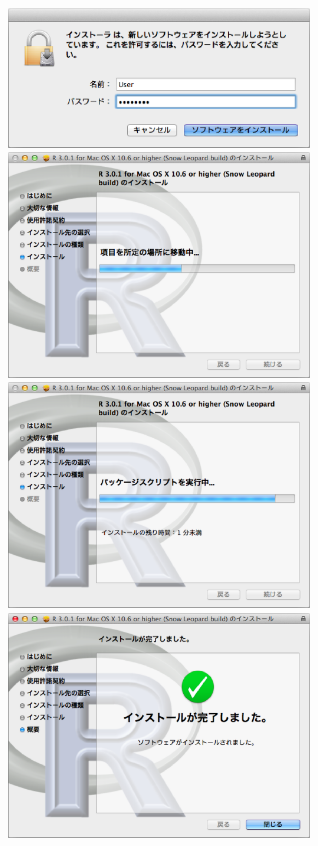 \documentclass[a4paper,10pt,fleqn]{jarticle}
\begin{document}
\includegraphics[width=8cm]{img/osx/osx008.eps}\hspace{0.8em} \includegraphics[width=8cm]{img/osx/osx009.eps}\\

\includegraphics[width=8cm]{img/osx/osx010.eps}\hspace{0.8em} \includegraphics[width=8cm]{img/osx/osx011.eps}\\
\end{document}
